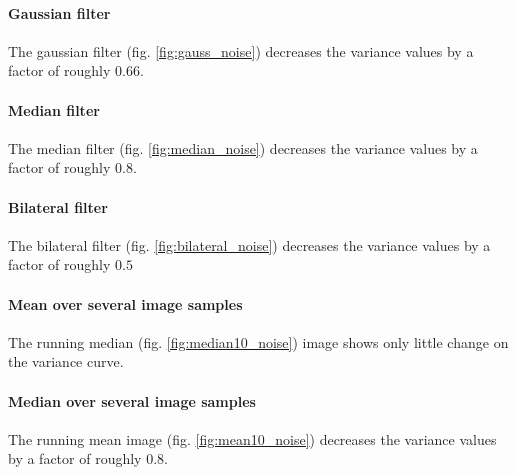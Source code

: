\documentclass[DIV12,a4paper]{scrartcl}
\begin{document}
\paragraph{Gaussian filter} The gaussian filter (fig. \ref{fig:gauss_noise}) decreases the variance values by a factor of roughly $0.66$.
\paragraph{Median filter} The median filter (fig. \ref{fig:median_noise}) decreases the variance values by a factor of roughly $0.8$.

\paragraph{Bilateral filter} The bilateral filter (fig. \ref{fig:bilateral_noise}) decreases the variance values by a factor of roughly $0.5$

\paragraph{Mean over several image samples} The running median (fig. \ref{fig:median10_noise}) image shows only little change on the variance curve.

\paragraph{Median over several image samples} The running mean image (fig. \ref{fig:mean10_noise}) decreases the variance values by a factor of roughly $0.8$.
\end{document}
